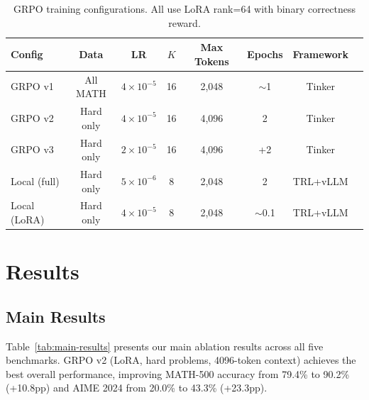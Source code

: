 \documentclass[11pt,a4paper]{article}
\begin{document}
\begin{table}[H]
\centering
\caption{GRPO training configurations. All use LoRA rank=64 with binary correctness reward.}
\label{tab:grpo-configs}
\small
\begin{tabular}{lccccccc}
\toprule
\textbf{Config} & \textbf{Data} & \textbf{LR} & \textbf{$K$} & \textbf{Max Tokens} & \textbf{Epochs} & \textbf{Framework} \\
\midrule
GRPO v1 & All MATH & $4\times10^{-5}$ & 16 & 2,048 & $\sim$1 & Tinker \\
GRPO v2 & Hard only & $4\times10^{-5}$ & 16 & 4,096 & 2 & Tinker \\
GRPO v3 & Hard only & $2\times10^{-5}$ & 16 & 4,096 & +2 & Tinker \\
Local (full) & Hard only & $5\times10^{-6}$ & 8 & 2,048 & 2 & TRL+vLLM \\
Local (LoRA) & Hard only & $4\times10^{-5}$ & 8 & 2,048 & $\sim$0.1 & TRL+vLLM \\
\bottomrule
\end{tabular}
\end{table}

\section{Results}
\label{sec:results}

\subsection{Main Results}

Table~\ref{tab:main-results} presents our main ablation results across all five benchmarks. GRPO v2 (LoRA, hard problems, 4096-token context) achieves the best overall performance, improving MATH-500 accuracy from 79.4\% to 90.2\% (+10.8pp) and AIME 2024 from 20.0\% to 43.3\% (+23.3pp).
\end{document}
